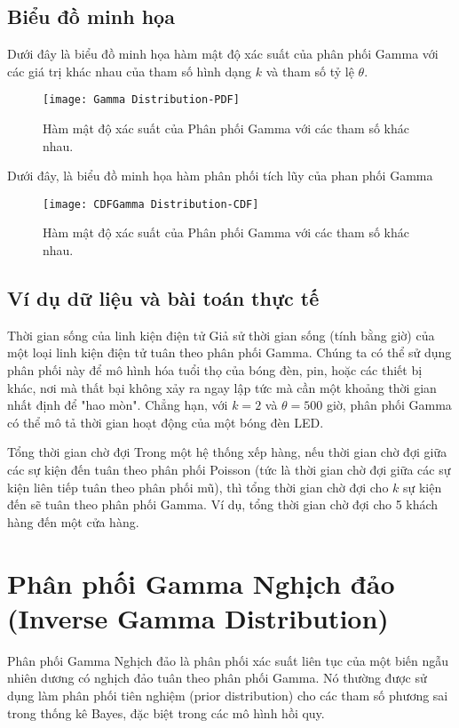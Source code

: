 	\subsection{Biểu đồ minh họa}
	Dưới đây là biểu đồ minh họa hàm mật độ xác suất của phân phối Gamma với các giá trị khác nhau của tham số hình dạng $k$ và tham số tỷ lệ $\theta$.
	
	\begin{figure}[h!]
		\centering
		\texttt{[image: Gamma Distribution-PDF]} %
		\caption{Hàm mật độ xác suất của Phân phối Gamma với các tham số khác nhau.}
		\label{fig:Gamma Distribution-PDF}
	\end{figure}
	
	Dưới đây, là biểu đồ minh họa hàm phân phối tích lũy của phan phối Gamma
	
		\begin{figure}[h!]
		\centering
		\texttt{[image: CDFGamma Distribution-CDF]} %
		\caption{Hàm mật độ xác suất của Phân phối Gamma với các tham số khác nhau.}
		\label{fig:Gamma Distribution-CDF}
	\end{figure}
	
	\subsection{Ví dụ dữ liệu và bài toán thực tế}
		Thời gian sống của linh kiện điện tử
		Giả sử thời gian sống (tính bằng giờ) của một loại linh kiện điện tử tuân theo phân phối Gamma. Chúng ta có thể sử dụng phân phối này để mô hình hóa tuổi thọ của bóng đèn, pin, hoặc các thiết bị khác, nơi mà thất bại không xảy ra ngay lập tức mà cần một khoảng thời gian nhất định để "hao mòn". Chẳng hạn, với $k=2$ và $\theta=500$ giờ, phân phối Gamma có thể mô tả thời gian hoạt động của một bóng đèn LED.
	
		Tổng thời gian chờ đợi
		Trong một hệ thống xếp hàng, nếu thời gian chờ đợi giữa các sự kiện đến tuân theo phân phối Poisson (tức là thời gian chờ đợi giữa các sự kiện liên tiếp tuân theo phân phối mũ), thì tổng thời gian chờ đợi cho $k$ sự kiện đến sẽ tuân theo phân phối Gamma. Ví dụ, tổng thời gian chờ đợi cho 5 khách hàng đến một cửa hàng.
	
\section{Phân phối Gamma Nghịch đảo (Inverse Gamma Distribution)}
	Phân phối Gamma Nghịch đảo là phân phối xác suất liên tục của một biến ngẫu nhiên dương có nghịch đảo tuân theo phân phối Gamma. Nó thường được sử dụng làm phân phối tiên nghiệm (prior distribution) cho các tham số phương sai trong thống kê Bayes, đặc biệt trong các mô hình hồi quy.
	
